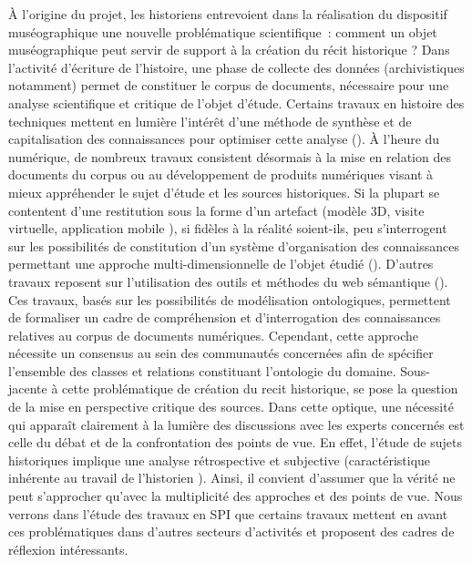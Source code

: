 \documentclass[a4paper,11pt,french]{article}
\begin{document}
À l'origine du projet, les historiens entrevoient dans la réalisation du dispositif muséographique une nouvelle problématique scientifique~: comment un objet muséographique peut servir de support à la création du récit historique ?
Dans l'activité d'écriture de l'histoire, une phase de collecte des données (archivistiques notamment) permet de constituer le corpus de documents, nécessaire pour une analyse scientifique et critique de l'objet d'étude. Certains travaux en histoire des techniques mettent en lumière l'intérêt d'une méthode de synthèse et de capitalisation des connaissances pour optimiser cette analyse ().
À l'heure du numérique, de nombreux travaux consistent désormais à la mise en relation des documents du corpus ou au développement de produits numériques visant à mieux appréhender le sujet d'étude et les sources historiques. Si la plupart se contentent d'une restitution sous la forme d'un artefact (modèle 3D, visite virtuelle, application mobile ), si fidèles à la réalité soient-ils, peu s'interrogent sur les possibilités de constitution d'un système d'organisation des connaissances permettant une approche multi-dimensionnelle de l'objet étudié ().
D'autres travaux reposent sur l'utilisation des outils et méthodes du web sémantique (). Ces travaux, basés sur les possibilités de modélisation ontologiques, permettent de formaliser un cadre de compréhension et d'interrogation des connaissances relatives au corpus de documents numériques. Cependant, cette approche nécessite un consensus au sein des communautés concernées afin de spécifier l'ensemble des classes et relations constituant l'ontologie du domaine.
Sous-jacente à cette problématique de création du recit historique, se pose la question de la mise en perspective critique des sources. Dans cette optique, une nécessité qui apparaît clairement à la lumière des discussions avec les experts concernés est celle du débat et de la confrontation des points de vue. En effet, l'étude de sujets historiques implique une analyse rétrospective et subjective (caractéristique inhérente au travail de l'historien ). Ainsi, il convient d'assumer que la vérité ne peut s'approcher qu'avec la multiplicité des approches et des points de vue. Nous verrons dans l'étude des travaux en SPI que certains travaux mettent en avant ces problématiques dans d'autres secteurs d'activités et proposent des cadres de réflexion intéressants.

\end{document}
